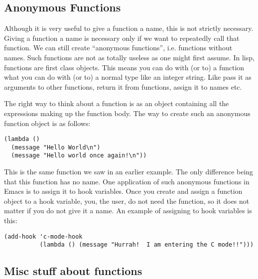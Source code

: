 \documentclass[10pt]{article}
\begin{document}
\subsection{Anonymous Functions}

Although it is very useful to give a function a name, this is not strictly
necessary.  Giving a function a name is necessary only if we want to repeatedly
call that function.  We can still create ``anonymous functions'', i.e.
functions without names.  Such functions are not as totally useless as one
might first assume.  In lisp, functions are first class objects.  This means
you can do with (or to) a function what you can do with (or to) a normal type
like an integer string.  Like pass it as arguments to other functions, return
it from functions, assign it to names etc.

The right way to think about a function is as an object containing all the
expressions making up the function body.  The way to create such an anonymous
function object is as follows:

\begin{verbatim}
(lambda ()
  (message "Hello World\n")
  (message "Hello world once again!\n"))
\end{verbatim}

This is the same function we saw in an earlier example.  The only difference
being that this function has no name.  One application of such anonymous
functions in Emacs is to assign it to hook variables.  Once you create and
assign a function object to a hook variable, you, the user, do not need the
function, so it does not matter if you do not give it a name.  An example of
assigning to hook variables is this:

\begin{verbatim}
(add-hook 'c-mode-hook 
          (lambda () (message "Hurrah!  I am entering the C mode!!")))
\end{verbatim}

\subsection{Misc stuff about functions}
\end{document}
